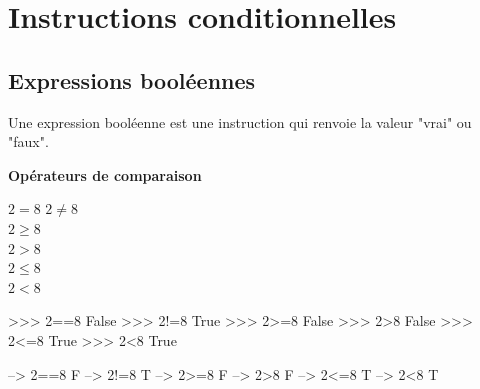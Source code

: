 \documentclass[11pt,oneside]{article}
\begin{document}
\section{Instructions conditionnelles}



\subsection{Expressions booléennes}
\begin{defi}
Une expression booléenne est une instruction qui renvoie la valeur "vrai" ou "faux".
\end{defi}

\begin{defi}
\textbf{Opérateurs de comparaison}


\begin{minipage}[c]{.3\linewidth}

\begin{pseudo}
\begin{algorithm}[H]
$2=8 $
$2\neq8 $\\
$2\geq 8 $\\
$2>8 $\\
$2\leq 8$\\
$2<8$\\
\end{algorithm}
\end{pseudo}

\end{minipage} \hfill
\begin{minipage}[c]{.3\linewidth}
\begin{py}
\begin{python}
 >>> 2==8
	False
 >>> 2!=8
	True
 >>> 2>=8
	False
 >>> 2>8
	False
 >>> 2<=8
	True
 >>> 2<8
	True
\end{python}
\end{py}
\end{minipage} \hfill
\begin{minipage}[c]{.3\linewidth}
\begin{sci}
\begin{scilab}
 --> 2==8
	F
 --> 2!=8
	T
 --> 2>=8
	F
 --> 2>8
	F
 --> 2<=8
	T
 --> 2<8
	T
\end{scilab}
\end{sci}
\end{minipage}

\end{defi}


\begin{exemple}

\end{exemple}
\end{document}
